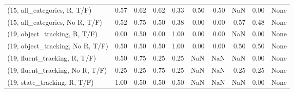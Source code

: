 \begin{table*}[h!]
\begin{adjustbox}{width=2\columnwidth,center}
\begin{tabular}{lrrr|rrr|rrr}
(15, all\_categories, R, T/F)          &                      0.57 &                  0.62 &                      0.62 &                          0.33 &                      0.50 &                          0.50 &                                    NaN &                               0.00 &                                  None \\
(15, all\_categories, No R, T/F)       &                      0.52 &                  0.75 &                      0.50 &                          0.38 &                      0.00 &                          0.00 &                                   0.57 &                               0.48 &                                  None \\



\midrule
(19, object\_tracking, R, T/F)         &                      0.00 &                  0.50 &                      0.00 &                          1.00 &                      0.00 &                          0.00 &                                    NaN &                               0.00 &                                  None \\
(19, object\_tracking, No R, T/F)      &                      0.50 &                  0.50 &                      0.50 &                          1.00 &                      0.00 &                          0.00 &                                   0.50 &                               0.50 &                                  None \\
(19, fluent\_tracking, R, T/F)         &                      0.50 &                  0.75 &                      0.25 &                          0.25 &                       NaN &                           NaN &                                    NaN &                               0.00 &                                  None \\
(19, fluent\_tracking, No R, T/F)      &                      0.25 &                  0.25 &                      0.75 &                          0.25 &                       NaN &                           NaN &                                   0.25 &                               0.25 &                                  None \\
(19, state\_tracking, R, T/F)          &                      1.00 &                  0.50 &                      0.50 &                          0.50 &                       NaN &                           NaN &                                    NaN &                               0.00 &                                  None \\

\end{tabular}
\end{adjustbox}
\end{table*}
